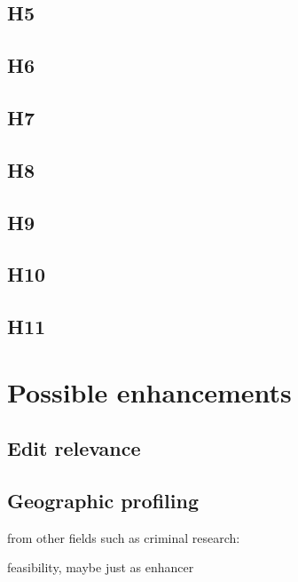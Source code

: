 \subsection*{H5}

\subsection*{H6}

\subsection*{H7}

\subsection*{H8}

\subsection*{H9}

\subsection*{H10}

\subsection*{H11}


\section{Possible enhancements}

\subsection{Edit relevance}


\subsection{Geographic profiling}

\begin{todos}
    \item {}
    \item {}
    \item from other fields such as criminal research: \\ 
    \item feasibility, maybe just as enhancer
\end{todos}


